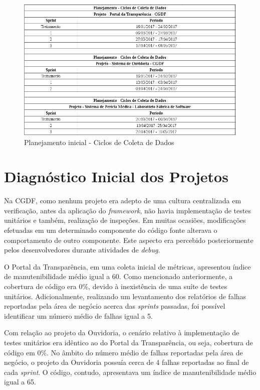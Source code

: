 \begin{figure}[!h]
\includegraphics[width=\textwidth]{figuras/planejamento.png}
\caption{Planejamento inicial - Ciclos de Coleta de Dados}
\end{figure}

\section{Diagnóstico Inicial dos Projetos}

Na CGDF, como nenhum projeto era adepto de uma cultura centralizada em verificação, antes da aplicação do \textit{framework}, não havia implementação de testes unitários e também, realização de inspeções. Em muitas ocasiões, modificações efetuadas em um determinado componente do código fonte alterava o comportamento de outro componente. Este aspecto era percebido posteriormente pelos desenvolvedores durante atividades de
\textit{debug}.

O Portal da Transparência, em uma coleta inicial de métricas, apresentou índice de manutenibilidade médio igual a 60. Como mencionado anteriormente, a cobertura de código era 0\%, devido à inexistência de uma suíte de testes unitários. Adicionalmente, realizando um levantamento dos relatórios de falhas reportadas pela área de negócio acerca das \textit{sprints} passadas, foi possível identificar um número médio de falhas igual a 5.

Com relação ao projeto da Ouvidoria, o cenário relativo à implementação de testes unitários era idêntico ao do Portal da Transparência, ou seja, cobertura de código em 0\%. No âmbito do número médio de falhas reportadas pela área de negócio, o projeto da Ouvidoria possuía cerca de 4 falhas reportadas ao final de cada \textit{sprint}. O código, contudo, apresentava um índice de manutenibilidade médio igual a 65.

